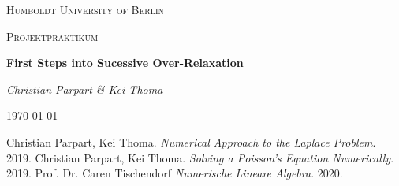 \documentclass[refman]{article}
\theoremstyle{definition}
\begin{document}
\begin{titlepage}
	\centering
	{\scshape\LARGE Humboldt University of Berlin \par}
	\vspace{1cm}
	{\scshape\Large Projektpraktikum \par}
	\vspace{1.5cm}
	{\huge\bfseries First Steps into Sucessive Over-Relaxation \par}
	\vspace{2cm}
	{\Large\itshape Christian Parpart \& Kei Thoma \par}
	\vfill

	\vfill

	{\large \today\par}
\end{titlepage}

\tableofcontents







\begin{thebibliography}{9}
	Christian Parpart, Kei Thoma. 
	\textit{Numerical Approach to the Laplace Problem}. 
    2019.
	Christian Parpart, Kei Thoma. 
	\textit{Solving a Poisson's Equation Numerically}. 
	2019.
	Prof. Dr. Caren Tischendorf
	\textit{Numerische Lineare Algebra}.
	2020.
\end{thebibliography}
\end{document}
